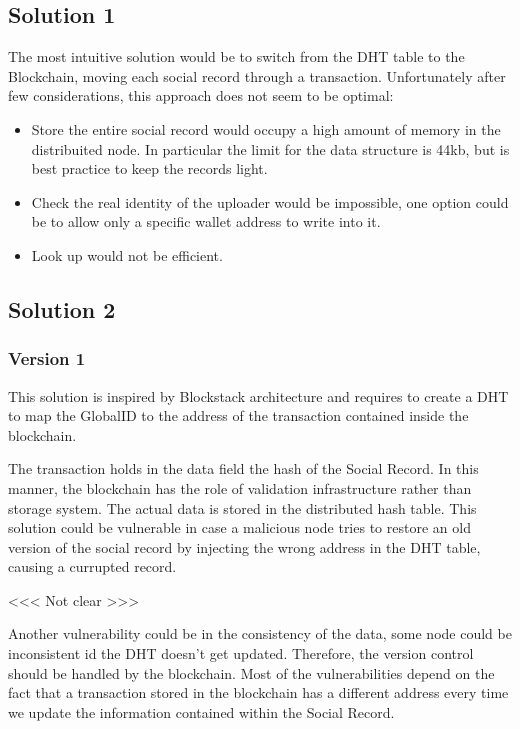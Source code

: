 \subsection{Solution 1}
The most intuitive solution would be to switch from the DHT table to the Blockchain, moving each social record through a transaction.
Unfortunately after few considerations, this approach does not seem to be optimal:
\begin{itemize}
	\item Store the entire social record would occupy a high amount of memory in the distribuited node.
	In particular the limit for the data structure is 44kb, but is best practice to keep the records light.
	\item Check the real identity of the uploader would be impossible, one option could be to allow only a specific wallet address to write into it.
	\item Look up would not be efficient.
\end{itemize}


\subsection{Solution 2}
\subsubsection{Version 1}
This solution is inspired by Blockstack architecture and requires to create a DHT to map the GlobalID to the address of the transaction contained inside the blockchain.

The transaction holds in the data field the hash of the Social Record. In this manner, the blockchain has the role of validation infrastructure rather than storage system. The actual data is stored in the distributed hash table. This solution could be vulnerable in case a malicious node tries to restore an old version of the social record by injecting the wrong address in the DHT table, causing a currupted record.


\begin{notation}
	<<< Not clear >>>
\end{notation}
Another vulnerability could be in the consistency of the data, some node could be inconsistent id the DHT doesn’t get updated. Therefore, the version control should be handled by the blockchain. Most of the vulnerabilities depend on the fact that a transaction stored in the blockchain has a different address every time we update the information contained within the Social Record.

